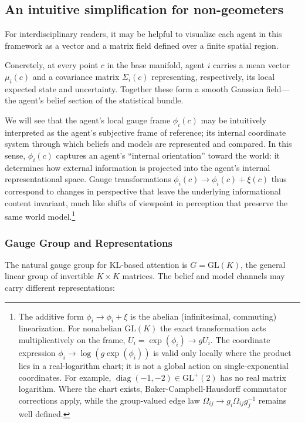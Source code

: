 \documentclass[twoside,11pt]{article}
\begin{document}
\subsection{An intuitive simplification for non-geometers}
For interdisciplinary readers, it may be helpful to visualize each agent in this framework as a vector and a matrix field defined over a finite spatial region. 

Concretely, at every point $c$ in the base manifold, agent $i$ carries a mean vector $\mu_i(c)$ and a covariance matrix $\Sigma_i(c)$ representing, respectively, its local expected state and uncertainty. Together these form a smooth Gaussian field—the agent’s belief section of the statistical bundle. 

We will see that the agent's local gauge frame $\phi_i(c)$ may be intuitively interpreted as the agent's subjective frame of reference; its internal coordinate system through which beliefs and models are represented and compared. In this sense, $\phi_i(c)$ captures an agent’s “internal orientation” toward the world: it determines how external information is projected into the agent’s internal representational space. Gauge transformations $\phi_i(c) \to \phi_i(c) + \xi(c)$ thus correspond to changes in perspective that leave the underlying informational content invariant, much like shifts of viewpoint in perception that preserve the same world model.\footnote{The additive form $\phi_i \to \phi_i + \xi$ is the abelian (infinitesimal, commuting) linearization. For nonabelian $\mathrm{GL}(K)$ the exact transformation acts multiplicatively on the frame, $U_i = \exp(\phi_i) \to g U_i$. The coordinate expression $\phi_i \to \log(g\exp(\phi_i))$ is valid only locally where the product lies in a real-logarithm chart; it is not a global action on single-exponential coordinates. For example, $\operatorname{diag}(-1,-2)\in\mathrm{GL}^+(2)$ has no real matrix logarithm. Where the chart exists, Baker-Campbell-Hausdorff commutator corrections apply, while the group-valued edge law $\Omega_{ij} \to g_i \Omega_{ij} g_j^{-1}$ remains well defined.}



\subsubsection{Gauge Group and Representations}
The natural gauge group for KL-based attention is $G = \mathrm{GL}(K)$, the general linear group of invertible $K \times K$ matrices. The belief and model channels may carry different representations:
\end{document}
